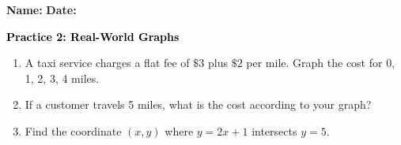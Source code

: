 \documentclass[12pt, letterpaper, fleqn]{article}
\begin{document}
\textbf{Name:} \underline{\hspace{5cm}}
\hfill
\textbf{Date:} \underline{\hspace{3cm}}\\

\begin{tcolorbox}[colback=customteal!20]
    \large\textcolor{black}{\textbf{Practice 2: Real-World Graphs}}
\end{tcolorbox}
\begin{enumerate}[itemsep=3.5cm, leftmargin=0.6cm]
\item A taxi service charges a flat fee of $\$3$ plus $\$2$ per mile. Graph the cost for 0, 1, 2, 3, 4 miles.
\vspace{4cm}
\item If a customer travels 5 miles, what is the cost according to your graph?
\vspace{3cm}
\item Find the coordinate $(x,y)$ where $y = 2x + 1$ intersects $y = 5$.
\end{enumerate}
\end{document}
